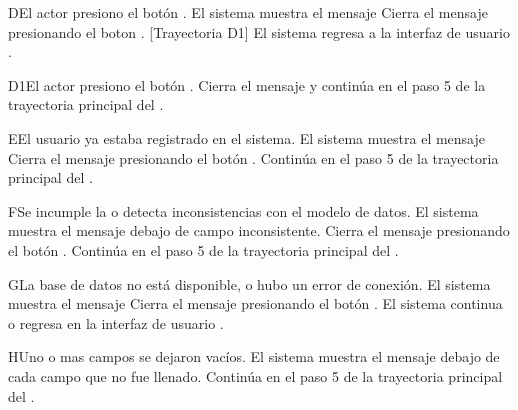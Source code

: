 \begin{UCtrayectoriaA}{D}{El actor presiono el botón .}
	\UCpaso El sistema muestra el mensaje 
	\UCpaso[\UCactor] Cierra el mensaje presionando el boton . [Trayectoria D1]
	\UCpaso El sistema regresa a la interfaz de usuario .
\end{UCtrayectoriaA}

\begin{UCtrayectoriaA}{D1}{El actor presiono el botón .}
	\UCpaso Cierra el mensaje y continúa en el paso 5 de la trayectoria principal del .	
\end{UCtrayectoriaA}

\begin{UCtrayectoriaA}{E}{El usuario ya estaba registrado en el sistema.}
	\UCpaso El sistema muestra el mensaje  
	\UCpaso[\UCactor] Cierra el mensaje presionando el botón .
	\UCpaso Continúa en el paso 5 de la trayectoria principal del .
\end{UCtrayectoriaA}

\begin{UCtrayectoriaA}{F}{Se incumple la  o detecta inconsistencias con el modelo de datos.}
		\UCpaso El sistema muestra el mensaje  debajo de campo inconsistente.
		\UCpaso[\UCactor] Cierra el mensaje presionando el botón .
		\UCpaso Continúa en el paso 5 de la trayectoria principal del .
	\end{UCtrayectoriaA}
	
	
	
	\begin{UCtrayectoriaA}{G}{La base de datos no está disponible, o hubo un error de conexión.}
		\UCpaso El sistema muestra el mensaje 
		\UCpaso[\UCactor] Cierra el mensaje presionando el botón .
		\UCpaso El sistema continua o regresa en la interfaz de usuario .
	\end{UCtrayectoriaA}
	
	
	\begin{UCtrayectoriaA}{H}{Uno o mas campos se dejaron vacíos.}
		\UCpaso El sistema muestra el mensaje  debajo de cada campo que no fue llenado. 
		\UCpaso	Continúa en el paso 5 de la trayectoria principal del .
	\end{UCtrayectoriaA}
